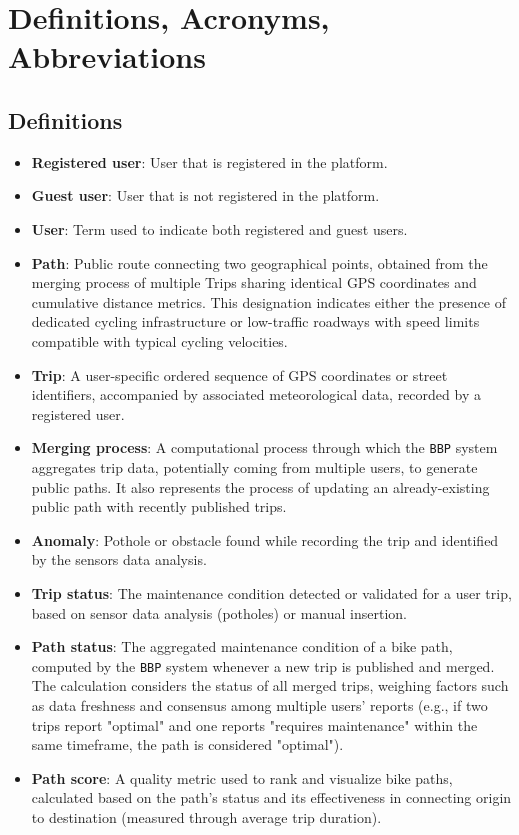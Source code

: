 \section{Definitions, Acronyms, Abbreviations}
\label{sec:definitions}

\subsection{Definitions}
\begin{itemize}
    \item \textbf{Registered user}: User that is registered in the platform.
    \item \textbf{Guest user}: User that is not registered in the platform.
    \item \textbf{User}: Term used to indicate both registered and guest users.
    \item \textbf{Path}: Public route connecting two geographical points, obtained from the merging process of multiple Trips sharing identical GPS coordinates and cumulative distance metrics. This designation indicates either the presence of dedicated cycling infrastructure or low-traffic roadways with speed limits compatible with typical cycling velocities.
    \item \textbf{Trip}: A user-specific ordered sequence of GPS coordinates or street identifiers, accompanied by associated meteorological data, recorded by a registered user.
    \item \textbf{Merging process}: A computational process through which the \texttt{BBP} system aggregates trip data, potentially coming from multiple users, to generate public paths. It also represents the process of updating an already-existing public path with recently published trips.
    \item \textbf{Anomaly}: Pothole or obstacle found while recording the trip and identified by the sensors data analysis.
    \item \textbf{Trip status}: The maintenance condition detected or validated for a user trip, based on sensor data analysis (potholes) or manual insertion.
    \item \textbf{Path status}: The aggregated maintenance condition of a bike path, computed by the \texttt{BBP} system whenever a new trip is published and merged. The calculation considers the status of all merged trips, weighing factors such as data freshness and consensus among multiple users' reports (e.g., if two trips report "optimal" and one reports "requires maintenance" within the same timeframe, the path is considered "optimal").
    \item \textbf{Path score}: A quality metric used to rank and visualize bike paths, calculated based on the path's status and its effectiveness in connecting origin to destination (measured through average trip duration).
\end{itemize}

